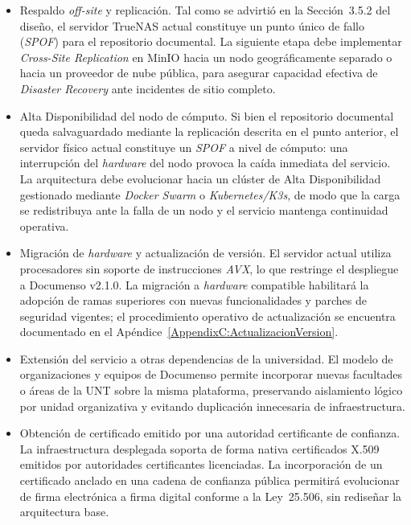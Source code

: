 \begin{itemize}
    \item Respaldo \textit{off-site} y replicación. Tal como se advirtió en la Sección~3.5.2 del diseño, el servidor TrueNAS actual constituye un punto único de fallo (\textit{SPOF}) para el repositorio documental. La siguiente etapa debe implementar \textit{Cross-Site Replication} en MinIO hacia un nodo geográficamente separado o hacia un proveedor de nube pública, para asegurar capacidad efectiva de \textit{Disaster Recovery} ante incidentes de sitio completo.
    \item Alta Disponibilidad del nodo de cómputo. Si bien el repositorio documental queda salvaguardado mediante la replicación descrita en el punto anterior, el servidor físico actual constituye un \textit{SPOF} a nivel de cómputo: una interrupción del \textit{hardware} del nodo provoca la caída inmediata del servicio. La arquitectura debe evolucionar hacia un clúster de Alta Disponibilidad gestionado mediante \textit{Docker Swarm} o \textit{Kubernetes/K3s}, de modo que la carga se redistribuya ante la falla de un nodo y el servicio mantenga continuidad operativa.
    \item Migración de \textit{hardware} y actualización de versión. El servidor actual utiliza procesadores sin soporte de instrucciones \textit{AVX}, lo que restringe el despliegue a Documenso v2.1.0. La migración a \textit{hardware} compatible habilitará la adopción de ramas superiores con nuevas funcionalidades y parches de seguridad vigentes; el procedimiento operativo de actualización se encuentra documentado en el Apéndice~\ref{AppendixC:ActualizacionVersion}.
    \item Extensión del servicio a otras dependencias de la universidad. El modelo de organizaciones y equipos de Documenso permite incorporar nuevas facultades o áreas de la UNT sobre la misma plataforma, preservando aislamiento lógico por unidad organizativa y evitando duplicación innecesaria de infraestructura.
    \item Obtención de certificado emitido por una autoridad certificante de confianza. La infraestructura desplegada soporta de forma nativa certificados X.509 emitidos por autoridades certificantes licenciadas. La incorporación de un certificado anclado en una cadena de confianza pública permitirá evolucionar de firma electrónica a firma digital conforme a la Ley~25.506, sin rediseñar la arquitectura base.
\end{itemize}
